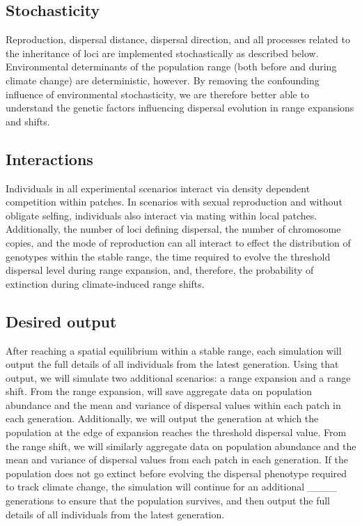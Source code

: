 \documentclass[11pt]{article}
\begin{document}
\subsection*{Stochasticity} 
Reproduction, dispersal distance, dispersal direction, and all processes related to the inheritance of loci are implemented stochastically as described below. Environmental determinants of the population range (both before and during climate change) are deterministic, however. By removing the confounding influence of environmental stochasticity, we are therefore better able to understand the genetic factors influencing dispersal evolution in range expansions and shifts.

\subsection*{Interactions} 
Individuals in all experimental scenarios interact via density dependent competition within patches. In scenarios with sexual reproduction and without obligate selfing, individuals also interact via mating within local patches. Additionally, the number of loci defining dispersal, the number of chromosome copies, and the mode of reproduction can all interact to effect the distribution of genotypes within the stable range, the time required to evolve the threshold dispersal level during range expansion, and, therefore, the probability of extinction during climate-induced range shifts.

\subsection*{Desired output} 
After reaching a spatial equilibrium within a stable range, each simulation will output the full details of all individuals from the latest generation. Using that output, we will simulate two additional scenarios: a range expansion and a range shift. From the range expansion, will save aggregate data on population abundance and the mean and variance of dispersal values within each patch in each generation. Additionally, we will output the generation at which the population at the edge of expansion reaches the threshold dispersal value. From the range shift, we will similarly aggregate data on population abundance and the mean and variance of dispersal values from each patch in each generation. If the population does not go extinct before evolving the dispersal phenotype required to track climate change, the simulation will continue for an additional \_\_\_\_ generations to ensure that the population survives, and then output the full details of all individuals from the latest generation.
\end{document}
